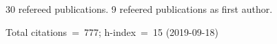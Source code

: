 30 refereed publications. 9 refeered publications as first author.

Total citations~=~777; h-index~=~15 (2019-09-18)